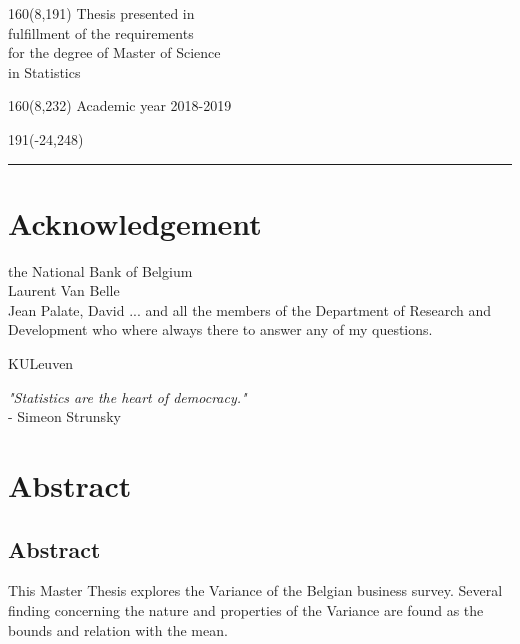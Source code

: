 \documentclass[12pt,a4paper,oneside]{book}
\begin{document}
%
\begin{textblock}{160}(8,191)
\textblockcolour{}
\vspace{-\parskip}
\flushright
Thesis presented in\\[4.5pt]
fulfillment of the requirements\\[4.5pt]
for the degree of Master of Science\\[4.5pt]
in Statistics\\
\end{textblock}
%
\begin{textblock}{160}(8,232)
\textblockcolour{}
\vspace{-\parskip}
\flushright
Academic year 2018-2019
\end{textblock}
%
\begin{textblock}{191}(-24,248)
{\color{blueline}\rule{550pt}{5.5pt}}
\end{textblock}
%
\vfill
\newpage

\rmfamily
\setcounter{page}{0}
\pagestyle{plain}



\chapter*{Acknowledgement}

the National Bank of Belgium \\
Laurent Van Belle \\
Jean Palate, David ... 
and all the members of the Department of Research and Development who where always there to answer any of my questions.


KULeuven


\vfill
\textit{"Statistics are the heart of democracy." }\\
- Simeon Strunsky


\chapter*{Abstract}


\section*{Abstract}
This Master Thesis explores the Variance of the Belgian business survey. 
Several finding concerning the nature and properties of the Variance are found as the bounds and relation with the mean.
\end{document}
